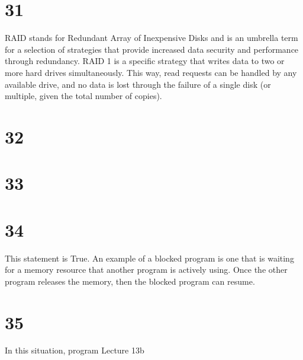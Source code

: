 \documentclass[a4paper,11pt]{article}
\begin{document}

\section*{31}
RAID stands for Redundant Array of Inexpensive Disks and is an umbrella term for a selection of strategies that provide increased data security and performance through redundancy.  RAID 1 is a specific strategy that writes data to two or more hard drives simultaneously.  This way, read requests can be handled by any available drive, and no data is lost through the failure of a single disk (or multiple, given the total number of copies).
 

\section*{32}


\section*{33}



\section*{34}
This statement is True.  An example of a blocked program is one that is waiting for a memory resource that another program is actively using.  Once the other program releases the memory, then the blocked program can resume.


\section*{35}
In this situation, program  Lecture 13b

\end{document}
